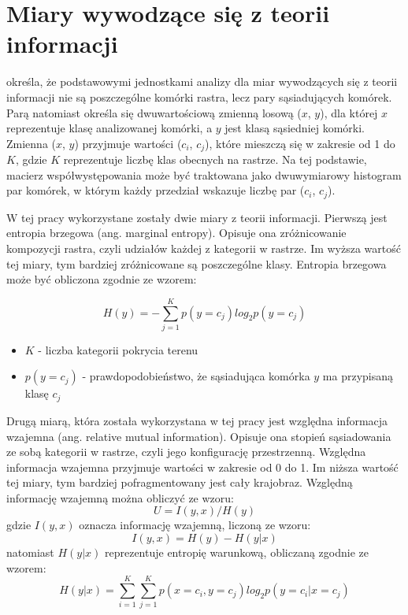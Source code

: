 \documentclass{amuthesis}
\begin{document}
\hypertarget{miary-wywodzux105ce-siux119-z-teorii-informacji}{%
\section{Miary wywodzące się z teorii
informacji}\label{miary-wywodzux105ce-siux119-z-teorii-informacji}}

\textcite{nowosad_it} określa, że podstawowymi jednostkami analizy dla
miar wywodzących się z teorii informacji nie są poszczególne komórki
rastra, lecz pary sąsiadujących komórek. Parą natomiast określa się
dwuwartościową zmienną losową (\(x\), \(y\)), dla której \(x\)
reprezentuje klasę analizowanej komórki, a \(y\) jest klasą sąsiedniej
komórki. Zmienna (\(x\), \(y\)) przyjmuje wartości (\(c_i\), \(c_j\)),
które mieszczą się w zakresie od 1 do \(K\), gdzie \(K\) reprezentuje
liczbę klas obecnych na rastrze. Na tej podstawie, macierz
współwystępowania może być traktowana jako dwuwymiarowy histogram par
komórek, w którym każdy przedział wskazuje liczbę par (\(c_i\),
\(c_j\)).

W tej pracy wykorzystane zostały dwie miary z teorii informacji.
Pierwszą jest entropia brzegowa (ang. marginal entropy). Opisuje ona
zróżnicowanie kompozycji rastra, czyli udziałów każdej z kategorii w
rastrze. Im wyższa wartość tej miary, tym bardziej zróżnicowane są
poszczególne klasy. Entropia brzegowa może być obliczona zgodnie ze
wzorem:

\[H(y) = -\sum_{j=1}^{K}p(y=c_{j})log_2p(y=c_j)\]

\begin{itemize}
\item
  \(K\) - liczba kategorii pokrycia terenu
\item
  \(p(y = c_j)\) - prawdopodobieństwo, że sąsiadująca komórka \(y\) ma
  przypisaną klasę \(c_j\)
\end{itemize}

Drugą miarą, która została wykorzystana w tej pracy jest względna
informacja wzajemna (ang. relative mutual information). Opisuje ona
stopień sąsiadowania ze sobą kategorii w rastrze, czyli jego
konfigurację przestrzenną. Względna informacja wzajemna przyjmuje
wartości w zakresie od 0 do 1. Im niższa wartość tej miary, tym bardziej
pofragmentowany jest cały krajobraz. Względną informację wzajemną można
obliczyć ze wzoru: \[U = I(y,x)/H(y)\] gdzie \(I(y,x)\) oznacza
informację wzajemną, liczoną ze wzoru: \[I(y,x) = H(y) - H(y|x)\]
natomiast \(H(y|x)\) reprezentuje entropię warunkową, obliczaną zgodnie
ze wzorem:
\[H(y|x) = \sum_{i=1}^{K}\sum_{j=1}^{K} p(x=c_i, y=c_j) log_2 p(y=c_i | x=c_j)\]
\end{document}
